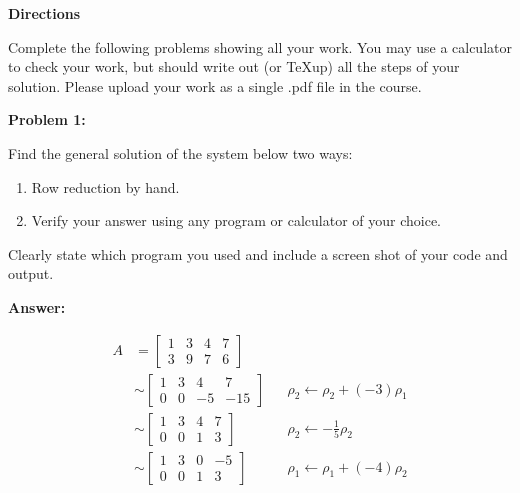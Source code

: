 \documentclass[10pt,letterpaper,final]{report}
\begin{document}
\begin{center}
  \vline
\end{center}

\medskip

\noindent\textbf{Directions}

Complete the following problems showing all your work. You may use a calculator to check your work, but should write out (or \TeX up) all the steps of your solution. Please upload your work as a single .pdf file in the course.

\medskip
\noindent\textbf{Problem 1:}
\medskip

Find the general solution of the system below two ways:
\begin{enumerate}
  \item Row reduction by hand.
  \item Verify your answer using any program or calculator of your choice.
\end{enumerate}
Clearly state which program you used and include a screen shot of your code and output.

\medskip
\noindent\textbf{Answer:}
\medskip

\begin{align*}
  A & =
  \left[\begin{array}{rrr|r}
      1 & 3 & 4 & 7 \\
      3 & 9 & 7 & 6
    \end{array}\right]
    \\[6pt]
    & \sim
    \left[\begin{array}{rrr|r}
      1 & 3 & 4  & 7   \\
      0 & 0 & -5 & -15
    \end{array}\right]
    &      & \rho_2 \leftarrow \rho_2 + (-3)\rho_1
    \\[6pt]
    & \sim
    \left[\begin{array}{rrr|r}
      1 & 3 & 4 & 7 \\
      0 & 0 & 1 & 3
    \end{array}\right]
    &      & \rho_2 \leftarrow -\tfrac{1}{5}\rho_2
    \\[6pt]
    & \sim
    \left[\begin{array}{rrr|r}
      1 & 3 & 0 & -5 \\
      0 & 0 & 1 & 3
    \end{array}\right]
    &      & \rho_1 \leftarrow \rho_1 + (-4)\rho_2
\end{align*}
\end{document}
